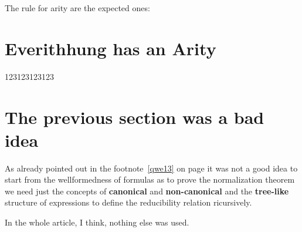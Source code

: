 \documentclass[11pt,a5paper,draft,oneside]{amsbook}
\theoremstyle{plain}%
\theoremstyle{definition}
\theoremstyle{remark}
\newcommand{\femph}{\textbf}
\begin{document}
	The rule for arity are the expected ones:
	
	\section{Everithhung has an Arity} 
		123123123123
	\section{The previous section was a bad idea}
		As already pointed out in the footnote~\ref{qwe13} on page \pageref{qwe13} it was not a good idea to start from the wellformedness of formulas as to prove the normalization theorem we need just the concepts of \femph{canonical} 
		and \femph{non-canonical} and the \femph{tree-like} structure of expressions to define the reducibility relation ricursively.
		
		In the whole article, I think, nothing else was used.
		
\end{document}
